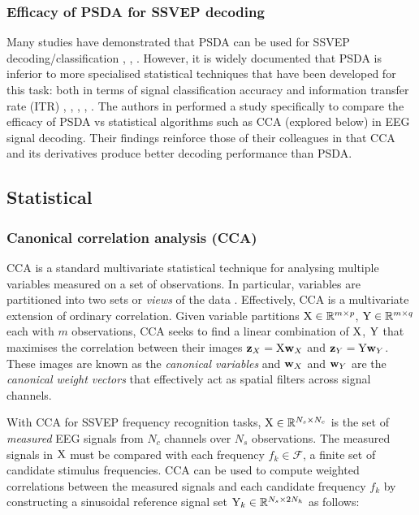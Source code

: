 \subsubsection{Efficacy of PSDA for SSVEP decoding}
\label{subsection:psda-vs-cca}
Many studies have demonstrated that PSDA can be used for SSVEP decoding/classification \cite{zhao-stimulus-layout-effect}, \cite{bci-survey-nicolas-alonso}, \cite{acampora-dataset}. However, it is widely documented that PSDA is inferior to more specialised statistical techniques that have been developed for this task: both in terms of signal classification accuracy and information transfer rate (ITR) \cite{autthasan-single-chan-ssvep}, \cite{lin-cca-2006}, \cite{sun-gcca}, \cite{zhang-mset-cca}, \cite{hakvoort-cca-psda-comparison}. The authors in \cite{hakvoort-cca-psda-comparison} performed a study specifically to compare the efficacy of PSDA vs statistical algorithms such as CCA (explored below) in EEG signal decoding. Their findings reinforce those of their colleagues in that CCA and its derivatives produce better decoding performance than PSDA.

\subsection{Statistical}

\subsubsection{Canonical correlation analysis (CCA)}
\label{subsection:CCA-c2}
CCA is a standard multivariate statistical technique for analysing multiple variables measured on a set of observations. In particular, variables are partitioned into two sets or \textit{views} of the data \cite{cca-tutorial}. Effectively, CCA is a multivariate extension of ordinary correlation. Given variable partitions ${\textrm{X}} \in \mathbb{R}^{m\times p}$, ${\textrm{Y}} \in \mathbb{R}^{m\times q}$ each with $m$ observations, CCA seeks to find a linear combination of ${\textrm{X}}$, ${\textrm{Y}}$ that maximises the correlation between their images ${\mathbf{z}}_X = {\textrm{X}}{\mathbf{w}}_X$ and ${\mathbf{z}}_Y = {\textrm{Y}}{\mathbf{w}}_Y$. These images are known as the \textit{canonical variables} and ${\mathbf{w}}_X$ and ${\mathbf{w}}_Y$ are the \textit{canonical weight vectors} that effectively act as spatial filters across signal channels.

With CCA for SSVEP frequency recognition tasks, ${\textrm{X}} \in \mathbb{R}^{N_s\times N_c}$ is the set of \textit{measured} EEG signals from $N_c$ channels over $N_s$ observations. The measured signals in ${\textrm{X}}$ must be compared with each frequency $f_k \in \mathcal{F}$, a finite set of candidate stimulus frequencies. CCA can be used to compute weighted correlations between the measured signals and each candidate frequency $f_k$ by constructing a sinusoidal reference signal set ${\textrm{Y}}_k \in \mathbb{R}^{N_s \times 2N_h}$ as follows: 

